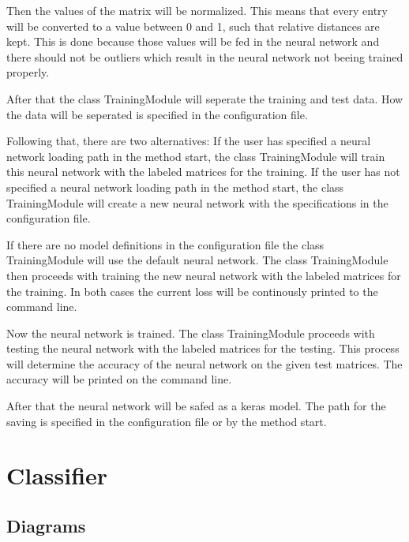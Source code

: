 \documentclass[parskip=full]{scrartcl}
\begin{document}
Then the values of the matrix will be normalized.
This means that every entry will be converted to a value between 0 and 1, such that relative distances are kept.
This is done because those values will be fed in the \gls{neural network} and there should not be outliers which result in the \gls{neural network} not beeing trained properly.

After that the class TrainingModule will seperate the training and test data.
How the data will be seperated is specified in the configuration file.\newline

Following that, there are two alternatives:
If the user has specified a \gls{neural network} loading path in the method start, the class TrainingModule will train this \gls{neural network} with the labeled matrices for the training.
If the user has not specified a \gls{neural network}  loading path in the method start, the class TrainingModule will create a new \gls{neural network} with the specifications in the configuration file.\newline

If there are no model definitions in the configuration file the class TrainingModule will use the \gls{default neural network}.
The class TrainingModule then proceeds with training the new \gls{neural network} with the labeled matrices for the training.
In both cases the current loss will be continously printed to the command line.\newline

Now the \gls{neural network} is trained. The class TrainingModule proceeds with testing the \gls{neural network} with the labeled matrices for the testing.
This process will determine the accuracy of the \gls{neural network} on the given test matrices.
The accuracy will be printed on the command line.\newline

After that the \gls{neural network} will be safed as a keras model.
The path for the saving is specified in the configuration file or by the method start.


\newpage
\section{Classifier}

\subsection{Diagrams}
\end{document}
